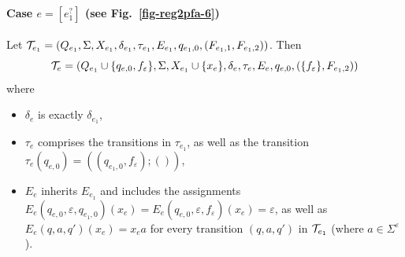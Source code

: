 \paragraph{Case $e = [e_1^?]$ (see Fig.~\ref{fig-reg2pfa-6})} Let $\mathcal{T}_{e_1} = (Q_{e_1}, \Sigma, X_{e_1}, \delta_{e_1}, \tau_{e_1}, E_{e_1}, q_{e_1,0}, (F_{e_1,1}, F_{e_1,2}))$. Then 
\[\mathcal{T}_e = (Q_{e_1} \cup \{q_{e,0}, f_{\varepsilon}\}, \Sigma, X_{e_1} \cup \{x_e\}, 
		\delta_e, \tau_e, E_{e}, q_{e,0}, (\{f_{\varepsilon}\}, F_{e_1,2}))\]
where  
		\begin{itemize}
			\item $\delta_e$ is exactly $\delta_{e_1}$,
			\item $\tau_e$ comprises the transitions in $\tau_{e_1}$, as well as the transition $\tau_e(q_{e,0}) = ((q_{e_1,0}, f_{\varepsilon}); ())$,
			\item $E_e$ inherits $E_{e_1}$ and includes the assignments $E_e(q_{e,0},\varepsilon,q_{e_1, 0})(x_e) = E_e(q_{e,0},\varepsilon,f_{\varepsilon})(x_e) =\varepsilon$, as well as $E_e(q, a, q')(x_e) =x_e a$ for every transition $(q, a, q')$ in $\mathcal{T}_{e_1}$ (where $a \in \Sigma^\varepsilon$).
		\end{itemize}
